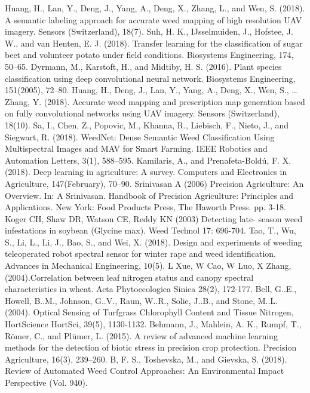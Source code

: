 \documentclass[journal,article,submit,moreauthors,pdftex]{Definitions/mdpi}
\begin{document}
\begin{thebibliography}{999}
 Huang, H., Lan, Y., Deng, J., Yang, A., Deng, X., Zhang, L., and Wen, S. (2018). A semantic labeling approach for accurate weed mapping of high resolution UAV imagery. Sensors (Switzerland), 18(7).
 Suh, H. K., IJsselmuiden, J., Hofstee, J. W., and van Henten, E. J. (2018). Transfer learning for the classification of sugar beet and volunteer potato under field conditions. Biosystems Engineering, 174, 50–65.
 Dyrmann, M., Karstoft, H., and Midtiby, H. S. (2016). Plant species classification using deep convolutional neural network. Biosystems Engineering, 151(2005), 72–80.
 Huang, H., Deng, J., Lan, Y., Yang, A., Deng, X., Wen, S., … Zhang, Y. (2018). Accurate weed mapping and prescription map generation based on fully convolutional networks using UAV imagery. Sensors (Switzerland), 18(10).
 Sa, I., Chen, Z., Popovic, M., Khanna, R., Liebisch, F., Nieto, J., and Siegwart, R. (2018). WeedNet: Dense Semantic Weed Classification Using Multispectral Images and MAV for Smart Farming. IEEE Robotics and Automation Letters, 3(1), 588–595.
 Kamilaris, A., and Prenafeta-Boldú, F. X. (2018). Deep learning in agriculture: A survey. Computers and Electronics in Agriculture, 147(February), 70–90.
Srinivasan A (2006) Precision Agriculture: An Overview. In: A Srinivasan. Handbook of Precision Agriculture: Principles and Applications. New York: Food Products Press, The Haworth Press. pp. 3-18.
 Koger CH, Shaw DR, Watson CE, Reddy KN (2003) Detecting late- season weed infestations in soybean (Glycine max). Weed Technol 17: 696-704.
Tao, T., Wu, S., Li, L., Li, J., Bao, S., and Wei, X. (2018). Design and experiments of weeding teleoperated robot spectral sensor for winter rape and weed identification. Advances in Mechanical Engineering, 10(5).
L Xue, W Cao, W Luo, X Zhang,(2004).Correlation between leaf nitrogen status and canopy spectral characteristics in wheat. Acta Phytoecologica Sinica 28(2), 172-177.
Bell, G..E., Howell, B..M., Johnson, G..V., Raun, W..R., Solie, J..B., and Stone, M..L. (2004). Optical Sensing of Turfgrass Chlorophyll Content and Tissue Nitrogen, HortScience HortSci, 39(5), 1130-1132.
Behmann, J., Mahlein, A. K., Rumpf, T., Römer, C., and Plümer, L. (2015). A review of advanced machine learning methods for the detection of biotic stress in precision crop protection. Precision Agriculture, 16(3), 239–260. 
B, F. S., Toshevska, M., and Gievska, S. (2018). Review of Automated Weed Control Approaches: An Environmental Impact Perspective (Vol. 940).

\end{thebibliography}
\end{document}
